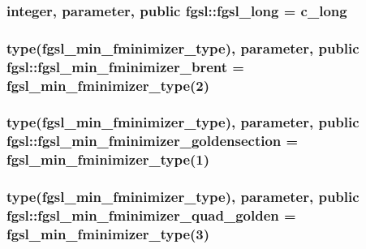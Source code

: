 \hypertarget{classfgsl_a22fca1111887118eb07d5f9688ea38ad}{
\subsubsection[{fgsl\-\_\-long}]{\setlength{\rightskip}{0pt plus 5cm}integer, parameter, public fgsl\-::fgsl\-\_\-long = c\-\_\-long}}\label{classfgsl_a22fca1111887118eb07d5f9688ea38ad}
\hypertarget{classfgsl_a0434a8f5d054ed9038714a856f8937ad}{
\subsubsection[{fgsl\-\_\-min\-\_\-fminimizer\-\_\-brent}]{\setlength{\rightskip}{0pt plus 5cm}type({\bf fgsl\-\_\-min\-\_\-fminimizer\-\_\-type}), parameter, public fgsl\-::fgsl\-\_\-min\-\_\-fminimizer\-\_\-brent = {\bf fgsl\-\_\-min\-\_\-fminimizer\-\_\-type}(2)}}\label{classfgsl_a0434a8f5d054ed9038714a856f8937ad}
\hypertarget{classfgsl_a372d8c5ea330e874febcdaf090c8f8fc}{
\subsubsection[{fgsl\-\_\-min\-\_\-fminimizer\-\_\-goldensection}]{\setlength{\rightskip}{0pt plus 5cm}type({\bf fgsl\-\_\-min\-\_\-fminimizer\-\_\-type}), parameter, public fgsl\-::fgsl\-\_\-min\-\_\-fminimizer\-\_\-goldensection = {\bf fgsl\-\_\-min\-\_\-fminimizer\-\_\-type}(1)}}\label{classfgsl_a372d8c5ea330e874febcdaf090c8f8fc}
\hypertarget{classfgsl_a7c479328d8e7e7d55f2fa4908d0122c9}{
\subsubsection[{fgsl\-\_\-min\-\_\-fminimizer\-\_\-quad\-\_\-golden}]{\setlength{\rightskip}{0pt plus 5cm}type({\bf fgsl\-\_\-min\-\_\-fminimizer\-\_\-type}), parameter, public fgsl\-::fgsl\-\_\-min\-\_\-fminimizer\-\_\-quad\-\_\-golden = {\bf fgsl\-\_\-min\-\_\-fminimizer\-\_\-type}(3)}}\label{classfgsl_a7c479328d8e7e7d55f2fa4908d0122c9}
